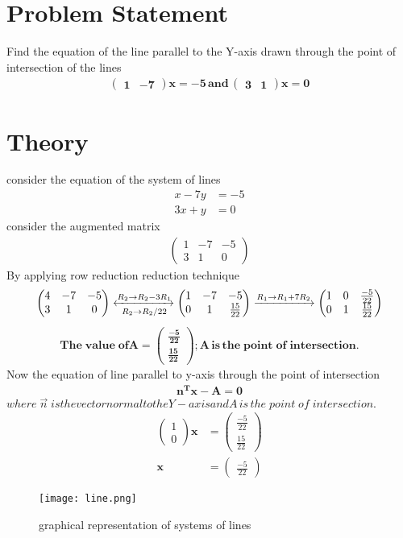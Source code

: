 \documentclass{article}
\newcommand{\myvec}[1]{\ensuremath{\begin{pmatrix}#1\end{pmatrix}}}
\begin{document}
\section{Problem Statement}
Find the equation of the line parallel to the Y-axis drawn through the point of intersection of the lines
\begin{align}
\mathbf{\myvec{1 & -7}x  =-5 \, and \, \myvec{3 & 1}x  = 0}
\end{align}
\section{Theory}
consider the equation of the system of lines
\begin{align}
x - 7y & = -5 \\
3x + y & = 0
\end{align}
 consider the augmented matrix
 \begin{align}
 \myvec{1 & -7 & -5 \\ 3 & 1 & 0}
 \end{align}
 By applying row reduction reduction technique \\
 \begin{align}
\myvec{4 & -7 & -5\\ 3 & 1 & 0}
	\xleftrightarrow[R_2 \rightarrow R_2/22]{R_2 \rightarrow R_2-3R_1}
	\myvec{1 & -7 & -5 \\ 0 & 1 & \frac{15}{22}}
	\xrightarrow[]{R_1 \rightarrow R_1+7R_2}
	 \myvec{1 & 0 & \frac{-5}{22} \\ 0 & 1 & \frac{15}{22}}
 \end{align}
\begin{align}
\mathbf{The\; value\; of{A} = \myvec{\frac{-5}{22} \\ \frac{15}{22}} ;
{A} \,is\, the\; point\; of \;intersection.}
\end{align}
 Now the equation of line parallel to y-axis through the point of intersection\\
\begin{align}
\mathbf{{n}^T{x}-{A} = 0}
\end{align}
$where \;\vec{n} \; is the vector normal to the Y - axis and{A}\, is\, the\; point\; of\; intersection.$
\begin{align}
\myvec{1 \\ 0}\bm{{x}} & = \myvec{ \frac{-5}{22}\\ \frac{15}{22}}
 \\
\bm{{x}} & = \myvec{\frac{-5}{22}} 
 \end{align}
 \begin{figure}
 \centering
 \texttt{[image: line.png]}
 \caption{graphical representation of systems of lines}
 \end{figure}
\end{document}
